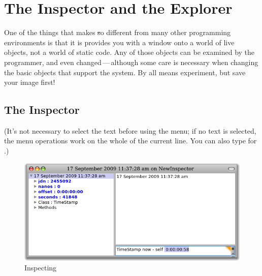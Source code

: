 \documentclass[a4paper,10pt,twoside]{book}
\begin{document}
\section{The Inspector and the Explorer}

One of the things that makes \st so different from many other programming environments is that it is provides you with a window onto a world of live objects, not a world of static code.
Any of those objects can be examined by the programmer, and even changed\,---\,although some care is necessary when changing the basic objects that support the system.  
By all means experiment, but save your image first!

\subsection{The Inspector}

(It's not necessary to select the text before using the menu; if no text is selected, the menu operations work on the whole of the current line.
You can also type  for .)

\begin{figure}[btp]
	\begin{center}
		\includegraphics[width=\textwidth]{inspectTimeNow1}
	\end{center}
	\caption{Inspecting }
\end{figure}
\end{document}
